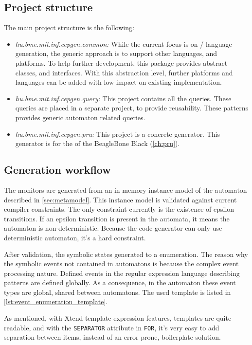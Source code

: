 \subsection{Project structure}

The main project structure is the following:
\begin{itemize}
	\item \emph{hu.bme.mit.inf.cepgen.common:} While the current focus is on \cpl/\cpp{} language generation, the generic approach is to support other languages, and platforms. To help further development, this package provides abstract classes, and interfaces. With this abstraction level, further platforms and languages can be added with low impact on existing implementation.
	\item \emph{hu.bme.mit.inf.cepgen.query:} This project contains all the \viatraq{} queries. These queries are placed in a separate project, to provide reusability. These patterns provides generic automaton related queries.
	\item \emph{hu.bme.mit.inf.cepgen.pru:} This project is a concrete generator. This generator is for the \pru{} of the BeagleBone Black (\cref{ch:pru}).
\end{itemize}

\subsection{Generation workflow}

The monitors are generated from an in-memory instance model of the automaton described in \cref{sec:metamodel}. This instance model is validated against current compiler constraints. The only constraint currently is the existence of epsilon transitions. If an epsilon transition is present in the automata, it means the automaton is non-deterministic. Because the code generator can only use deterministic automaton, it's a hard constraint.

After validation, the symbolic states generated to a \cpp{} enumeration. The reason why the symbolic events not contained in automatons is because the complex event processing nature. Defined events in the regular expression language describing patterns are defined globally. As a consequence, in the automaton these event types are global, shared between automatons. The used template is listed in \cref{lst:event_enumeration_template}.

As mentioned, with Xtend template expression features, templates are quite readable, and with the \texttt{SEPARATOR} attribute in \texttt{FOR}, it's very easy to add separation between items, instead of an error prone, boilerplate solution.

